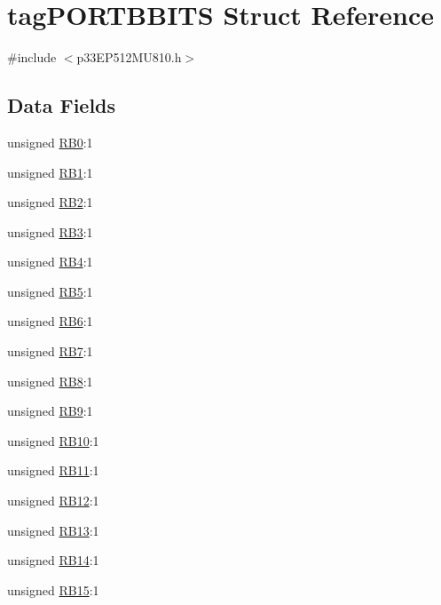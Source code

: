 \hypertarget{structtag_p_o_r_t_b_b_i_t_s}{}\section{tag\+P\+O\+R\+T\+B\+B\+I\+TS Struct Reference}
\label{structtag_p_o_r_t_b_b_i_t_s}


{\ttfamily \#include $<$p33\+E\+P512\+M\+U810.\+h$>$}

\subsection*{Data Fields}
\begin{DoxyCompactItemize}
\item 
unsigned \hyperlink{structtag_p_o_r_t_b_b_i_t_s_ad7a7c5386a08c77d293ac8de282bb7ee}{R\+B0}\+:1
\item 
unsigned \hyperlink{structtag_p_o_r_t_b_b_i_t_s_a2dd83fe6920ad970c529af6a85f29917}{R\+B1}\+:1
\item 
unsigned \hyperlink{structtag_p_o_r_t_b_b_i_t_s_acd7d4150f0717db56bb0849d8643a7ce}{R\+B2}\+:1
\item 
unsigned \hyperlink{structtag_p_o_r_t_b_b_i_t_s_adfc0d406dbec0d9ad7e8e05d6b9e8dc6}{R\+B3}\+:1
\item 
unsigned \hyperlink{structtag_p_o_r_t_b_b_i_t_s_a5ab7a1f43e97bcba0b28b5a32fcd8f2e}{R\+B4}\+:1
\item 
unsigned \hyperlink{structtag_p_o_r_t_b_b_i_t_s_ab8751b90688e9e19f9e26131a9174150}{R\+B5}\+:1
\item 
unsigned \hyperlink{structtag_p_o_r_t_b_b_i_t_s_a352d769bfd44cae31a5e9f836c70ddf3}{R\+B6}\+:1
\item 
unsigned \hyperlink{structtag_p_o_r_t_b_b_i_t_s_a1e0c6dd8b0b71363366459af62cbaeaf}{R\+B7}\+:1
\item 
unsigned \hyperlink{structtag_p_o_r_t_b_b_i_t_s_a2825ec1e15724a33a16ee7b322603c58}{R\+B8}\+:1
\item 
unsigned \hyperlink{structtag_p_o_r_t_b_b_i_t_s_adcf2107e3a49ae49f996d816a2551b28}{R\+B9}\+:1
\item 
unsigned \hyperlink{structtag_p_o_r_t_b_b_i_t_s_a1e5c36f659383b8b79907479490b417d}{R\+B10}\+:1
\item 
unsigned \hyperlink{structtag_p_o_r_t_b_b_i_t_s_a490c70704d9c6f3280b9b4ecec232409}{R\+B11}\+:1
\item 
unsigned \hyperlink{structtag_p_o_r_t_b_b_i_t_s_ac465e37ee16e338e68e50d808f7d0c71}{R\+B12}\+:1
\item 
unsigned \hyperlink{structtag_p_o_r_t_b_b_i_t_s_a55f876a4e484b0a93bb0ccb803b9eaf5}{R\+B13}\+:1
\item 
unsigned \hyperlink{structtag_p_o_r_t_b_b_i_t_s_a24a36ff4de8fc335f49065720e4a5e35}{R\+B14}\+:1
\item 
unsigned \hyperlink{structtag_p_o_r_t_b_b_i_t_s_a93032be8badfa1e705503bba07aaf319}{R\+B15}\+:1
\end{DoxyCompactItemize}


